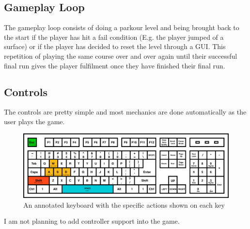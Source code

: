 \documentclass[12pt]{article}
\begin{document}
	\subsection{Gameplay Loop}
	The gameplay loop consists of doing a parkour level and being brought back to the start if the player has hit a fail condition (E.g. the player jumped of a surface) or if the player has decided to reset the level through a GUI. This repetition of playing the same course over and over again until their successful final run gives the player fulfilment once they have finished their final run.
	\newpage
	\subsection{Controls}
	The controls are pretty simple and most mechanics are done automatically as the user plays the game.
	
	\begin{figure}[h]
		\includegraphics[scale=0.2]{keyboardLayout}
		\centering
		\caption{An annotated keyboard with the specific actions shown on each key}
	\end{figure}
	
	I am not planning to add controller support into the game.
	
\end{document}
